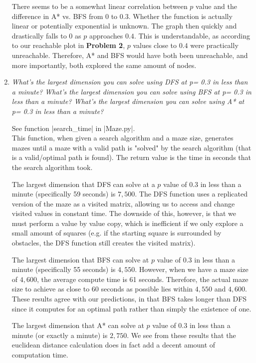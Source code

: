 \documentclass[12pt, twoside]{article}
\begin{document}
\begin{enumerate}
        \vspace{4mm}
        There seems to be a somewhat linear correlation between $p$ value and the difference in A* vs. BFS from $0$ to $0.3$. Whether the function is actually linear or potentially exponential is unknown. The graph then quickly and drastically falls to $0$ as $p$ approaches $0.4$. This is understandable, as according to our reachable plot in \textbf{Problem 2}, $p$ values close to $0.4$ were practically unreachable. Therefore, A* and BFS would have both been unreachable, and more importantly, both explored the same amount of nodes.

        \vfill
        \pagebreak
    
    \item
        \textit{What’s the largest dimension you can solve using DFS at p= 0.3 in less than a minute? What’s  the  largest  dimension  you  can  solve  using  BFS  at p= 0.3 in  less  than  a  minute?  What’s  the largest dimension you can solve using A* at p= 0.3 in less than a minute?}

        \vspace{4mm}
        See function \cverb|search_time| in \cverb|Maze.py|. \\
        This function, when given a search algorithm and a maze size, generates mazes until a maze with a valid path is "solved" by the search algorithm (that is a valid/optimal path is found). The return value is the time in seconds that the search algorithm took.

        \vspace{4mm}
        The largest dimension that DFS can solve at a $p$ value of 0.3 in less than a minute (specifically 59 seconds) is $7,500$. The DFS function uses a replicated version of the maze as a visited matrix, allowing us to access and change visited values in constant time. The downside of this, however, is that we must perform a value by value copy, which is inefficient if we only explore a small amount of squares (e.g. if the starting square is surrounded by obstacles, the DFS function still creates the visited matrix).

        \vspace{4mm}
        The largest dimension that BFS can solve at $p$ value of 0.3 in less than a minute (specifically 55 seconds) is $4,550$. However, when we have a maze size of $4,600$, the average compute time is 61 seconds. Therefore, the actual maze size to achieve as close to 60 seconds as possible lies within $4,550$ and $4,600$. These results agree with our predictions, in that BFS takes longer than DFS since it computes for an optimal path rather than simply the existence of one.

        \vspace{4mm}
        The largest dimension that A* can solve at $p$ value of 0.3 in less than a minute (or exactly a minute) is $2,750$. We see from these results that the euclidean distance calculation does in fact add a decent amount of computation time. 

        \vfill

\end{enumerate}
\pagebreak
\end{document}
